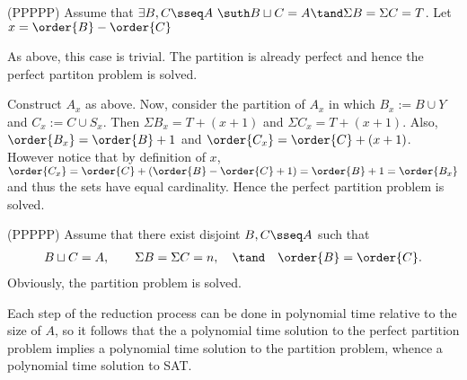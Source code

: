 \documentclass{article}
\begin{document}
\begin{solution}
  \begin{subproof}[Correctness.]
    (PP\imp PPP)
    Assume that $ \exists B,C\sseq A\ \suth B\sqcup C = A \tand \Sigma B = \Sigma C = T $. Let $ x=\order{B}-\order{C} $

    \begin{subproof}[Case 1 ($ x = 0 $).]
      As above, this case is trivial. The partition is already perfect and hence the perfect partiton problem is solved.
    \end{subproof}
    \begin{subproof}
      Construct $ A_x $ as above.
      Now, consider the partition of $ A_x $ in which $ B_x := B\cup Y $ and $ C_x := C\cup S_x $.
      Then $ \Sigma B_x = T + (x+1) $ and $ \Sigma C_x = T + (x+1) $.
      Also, $ \order{B_x} = \order{B}+1 $ and $ \order{C_x} = \order{C}+(x+1) $.
      However notice that by definition of $ x $, $ \order{C_x} = \order{C} + (\order{B} - \order{C} + 1) = \order{B} + 1 = \order{B_x} $ and thus the sets have equal cardinality.
      Hence the perfect partition problem is solved.
    \end{subproof}

    (PP\pmi PPP)
    Assume that there exist disjoint $ B,C\sseq A $ such that
    \begin{align*}
      B\sqcup C = A, \qquad \Sigma B = \Sigma C = n, \quad \tand \quad \order{B}=\order{C}.
    \end{align*}
    Obviously, the partition problem is solved.
  \end{subproof}
  Each step of the reduction process can be done in polynomial time relative to the size of $ A $, so it follows that the a polynomial time solution to the perfect partition problem implies a polynomial time solution to the partition problem, whence a polynomial time solution to SAT.
\end{solution}
\pagebreak
\end{document}
